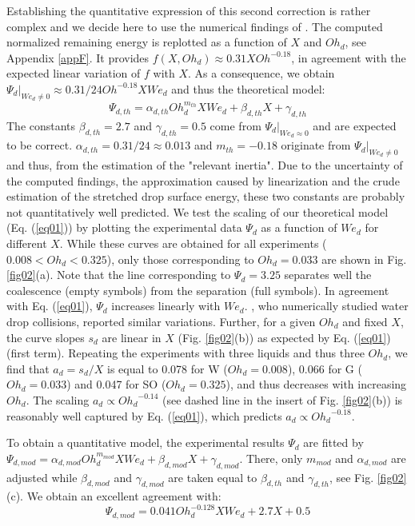 \documentclass{article}
\begin{document}
Establishing the quantitative expression of this second correction is rather complex and we decide here to use the numerical findings of \cite{ref:Finotello2017}. The computed normalized remaining energy is replotted as a function of $X$ and $Oh_d$, see Appendix \ref{appF}. It   provides $f(X, Oh_d) \approx 0.31 X  {Oh}^{-0.18} $, in agreement with the expected linear variation of $f$ with $X$. As a consequence, we obtain $\Psi_d|_{We_d \neq 0} \approx 0.31/24 {Oh}^{-0.18} X We_d$ and thus the theoretical model:
\begin{equation}
\Psi_{d, th} =  \alpha_{d, th} Oh_d^{m_{th}}  X We_d + \beta_{d, th} X + \gamma_{d, th} \tag{1}
\label{eq01}
\end{equation}
The constants $\beta_{d, th}=2.7$ and $\gamma_{d, th}=0.5$ come from $\Psi_d|_{We_d \approx0}$ and are expected to be correct.   $\alpha_{d, th}= 0.31/24\approx0.013$ and $m_{th}=-0.18$ originate from  $\Psi_d|_{We_d \neq0}$ and thus, from the estimation of the "relevant inertia". Due to the uncertainty of the computed findings, the  approximation caused by linearization and the crude estimation of the stretched drop surface energy, these two constants are probably not quantitatively well predicted.  We  test the scaling of  our theoretical model (Eq. (\ref{eq01})) by plotting the experimental data $\Psi_{d}$ as a function of $We_d$ for different $X$. While these curves are obtained for all experiments ($0.008<Oh_d<0.325$), only those corresponding to $Oh_d=0.033$ are shown in  Fig. \ref{fig02}(a). Note that the line corresponding to {$\Psi_d=3.25$} separates well the coalescence (empty symbols) from the separation (full symbols). 
In agreement with Eq. (\ref{eq01}),  $\Psi_d$  increases linearly with $We_d$.  \cite{ref:Saroka2015}, who numerically studied water drop collisions, reported similar variations. 
Further, for a given {$Oh_d$ and fixed $X$}, the curve slopes  $s_d$ are linear in $X$ (Fig. \ref{fig02}(b)) as expected by Eq. (\ref{eq01}) (first term). Repeating the experiments with three liquids and thus three $Oh_d$, we find that $a_d=s_d/X$ is equal to 0.078 for W ($Oh_d=0.008$), 0.066 for G ($Oh_d=0.033$) and 0.047 for SO ($Oh_d=0.325$), and thus decreases with increasing  $Oh_d$. The  scaling $a_d \propto {Oh_d}^{-0.14}$ (see dashed line in the insert of Fig. \ref{fig02}(b)) is  reasonably well captured by Eq. (\ref{eq01}), which predicts $a_d \propto {Oh_d}^{-0.18}$.

To obtain a quantitative model, the experimental results $\Psi_{d}$ are fitted by $\Psi_{d, mod} =  \alpha_{d, mod} Oh_d^{m_{mod}}  X We_d + \beta_{d, mod} X + \gamma_{d, mod}$. There, only $m_{mod}$ and  $\alpha_{d, mod}$ are adjusted  while  $\beta_{d, mod}$  and $\gamma_{d, mod}$ are taken  equal to $\beta_{d, th}$  and $\gamma_{d, th}$, see Fig. \ref{fig02}(c). We obtain an excellent agreement with:
\begin{equation}
\Psi_{d, mod} =  0.041 Oh_d^{-0.128}  X We_d + 2.7 X + 0.5
\tag{2} \label{eq01_b}
\end{equation}
\end{document}
